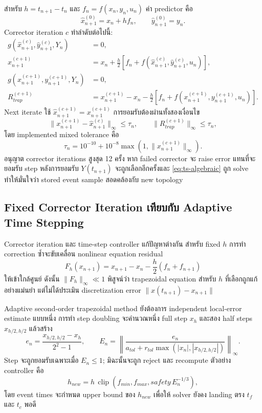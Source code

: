 \documentclass[12pt,a4paper]{article}
\begin{document}
สำหรับ $h=t_{n+1}-t_n$ และ $f_n=f(x_n,y_n,u_n)$ ค่า predictor คือ
\begin{equation}
\hat x^{(0)}_{n+1}=x_n+h f_n,\qquad
\hat y^{(0)}_{n+1}=y_n.
\label{eq:ts-predictor}
\end{equation}
Corrector iteration $c$ ทำลำดับต่อไปนี้:
\begin{align}
g(\hat x^{(c)}_{n+1},\hat y^{(c)}_{n+1},Y_n)&=0,\\
x^{(c+1)}_{n+1}
 &=x_n+\frac{h}{2}\left[f_n+
 f(\hat x^{(c)}_{n+1},\hat y^{(c)}_{n+1},u_n)\right],\\
g(x^{(c+1)}_{n+1},y^{(c+1)}_{n+1},Y_n)&=0,\\
R^{(c+1)}_{trap}
 &=x^{(c+1)}_{n+1}-x_n-\frac{h}{2}\left[f_n+
 f(x^{(c+1)}_{n+1},y^{(c+1)}_{n+1},u_n)\right].
\label{eq:ts-corrector}
\end{align}
Next iterate ใช้ $\hat x^{(c+1)}_{n+1}=x^{(c+1)}_{n+1}$ การยอมรับต้องผ่านทั้งสองเงื่อนไข
\begin{equation}
\|x^{(c+1)}_{n+1}-\hat x^{(c)}_{n+1}\|_\infty\le\tau_n,
\qquad
\|R^{(c+1)}_{trap}\|_\infty\le\tau_n,
\end{equation}
โดย implemented mixed tolerance คือ
\begin{equation}
\tau_n=10^{-10}+10^{-8}\max\left(1,\|x^{(c+1)}_{n+1}\|_\infty\right).
\end{equation}
อนุญาต corrector iterations สูงสุด 12 ครั้ง หาก failed corrector จะ raise error แทนที่จะยอมรับ step หลังการยอมรับ $Y(t_{n+1})$ จะถูกเลือกอีกครั้งและ \eqref{eq:ts-algebraic} ถูก solve ทำให้มั่นใจว่า stored event sample สอดคล้องกับ new topology

\subsection{Fixed Corrector Iteration เทียบกับ Adaptive Time Stepping}

Corrector iteration และ time-step controller แก้ปัญหาต่างกัน สำหรับ fixed $h$ การทำ correction ซ้ำจะขับเคลื่อน nonlinear equation residual
\begin{equation}
F_h(x_{n+1})=
x_{n+1}-x_n-\frac{h}{2}\left(f_n+f_{n+1}\right)
\end{equation}
ให้เข้าใกล้ศูนย์ ดังนั้น $\|F_h\|_\infty\ll1$ พิสูจน์ว่า trapezoidal equation สำหรับ $h$ ที่เลือกถูกแก้อย่างแม่นยำ แต่ไม่ได้ประเมิน discretization error $\|x(t_{n+1})-x_{n+1}\|$

Adaptive second-order trapezoidal method ยังต้องการ independent local-error estimate แบบหนึ่ง การทำ step doubling จะคำนวณหนึ่ง full step $x_h$ และสอง half steps $x_{h/2,h/2}$ แล้วสร้าง
\begin{equation}
e_n=\frac{x_{h/2,h/2}-x_h}{2^2-1},\qquad
E_n=\left\|
\frac{e_n}{a_{tol}+r_{tol}\max(|x_n|,|x_{h/2,h/2}|)}
\right\|_\infty.
\label{eq:adaptive-estimator}
\end{equation}
Step จะถูกยอมรับเฉพาะเมื่อ $E_n\le1$; มิฉะนั้นจะถูก reject และ recompute ตัวอย่าง controller คือ
\begin{equation}
h_{new}=h\,
\operatorname{clip}\left(f_{min},f_{max},
safety\,E_n^{-1/3}\right),
\label{eq:adaptive-controller}
\end{equation}
โดย event times จะกำหนด upper bound ของ $h_{new}$ เพื่อให้ solver ยังคง landing ตรง $t_f$ และ $t_c$ พอดี
\end{document}

